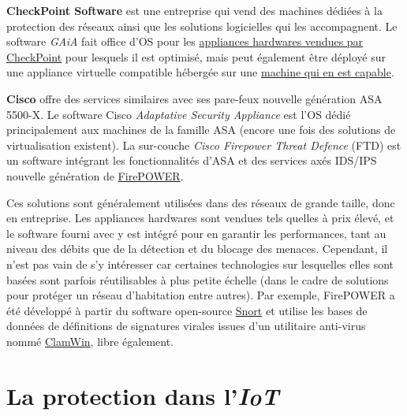 \documentclass[]{article}
\begin{document}
\par \textbf{CheckPoint Software} est une entreprise qui vend des machines dédiées à la protection des réseaux ainsi que les solutions logicielles qui les accompagnent. Le software \textit{GAiA} fait office d'OS pour les \href{https://www.checkpoint.com/downloads/products/check-point-appliances-brochure.pdf}{appliances hardwares vendues par CheckPoint} pour lesquels il est optimisé, mais peut également être déployé sur une appliance virtuelle compatible hébergée sur une \href{https://www.checkpoint.com/support-services/hcl/}{machine qui en est capable}.\\

\par \textbf{Cisco} offre des services similaires avec ses pare-feux nouvelle génération ASA 5500-X. Le software Cisco \textit{Adaptative Security Appliance} est l'OS dédié principalement aux machines de la famille ASA (encore une fois des solutions de virtualisation existent). La sur-couche \textit{Cisco Firepower Threat Defence} (FTD) est un software intégrant les fonctionnalités d'ASA et des services axés IDS/IPS nouvelle génération de \href{https://en.wikipedia.org/wiki/Sourcefire}{FirePOWER}.\\

\par Ces solutions sont généralement utilisées dans des réseaux de grande taille, donc en entreprise. Les appliances hardwares sont vendues tels quelles à prix élevé, et le software fourni avec y est intégré pour en garantir les performances, tant au niveau des débits que de la détection et du blocage des menaces. Cependant, il n'est pas vain de s'y intéresser car certaines technologies sur lesquelles elles sont basées sont parfois réutilisables à plus petite échelle (dans le cadre de solutions pour protéger un réseau d'habitation entre autres). Par exemple, FirePOWER a été développé à partir du software open-source \href{https://en.wikipedia.org/wiki/Snort_(software)}{Snort} et utilise les bases de données de définitions de signatures virales issues d'un utilitaire anti-virus nommé \href{http://www.clamwin.com/content/view/58/27/}{ClamWin}, libre également.

\newpage


\section{La protection dans l'\textit{IoT}}\label{prot_IoT}
\end{document}
